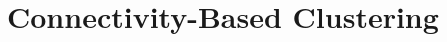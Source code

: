 \chapter{Connectivity-Based Clustering}
\begin{refsection}
%
\printbibliography[heading=subbibliography]
\end{refsection}